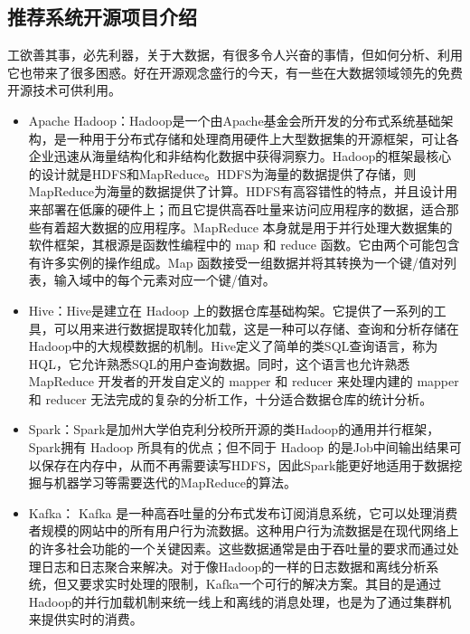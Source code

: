 	\subsection{推荐系统开源项目介绍}
	工欲善其事，必先利器，关于大数据，有很多令人兴奋的事情，但如何分析、利用它也带来了很多困惑。好在开源观念盛行的今天，有一些在大数据领域领先的免费开源技术可供利用。
	\begin{itemize}
		\item Apache Hadoop：Hadoop是一个由Apache基金会所开发的分布式系统基础架构，是一种用于分布式存储和处理商用硬件上大型数据集的开源框架，可让各企业迅速从海量结构化和非结构化数据中获得洞察力。Hadoop的框架最核心的设计就是HDFS和MapReduce。HDFS为海量的数据提供了存储，则MapReduce为海量的数据提供了计算。HDFS有高容错性的特点，并且设计用来部署在低廉的硬件上；而且它提供高吞吐量来访问应用程序的数据，适合那些有着超大数据的应用程序。MapReduce 本身就是用于并行处理大数据集的软件框架，其根源是函数性编程中的 map 和 reduce 函数。它由两个可能包含有许多实例的操作组成。Map 函数接受一组数据并将其转换为一个键/值对列表，输入域中的每个元素对应一个键/值对。
		\item Hive：Hive是建立在 Hadoop 上的数据仓库基础构架。它提供了一系列的工具，可以用来进行数据提取转化加载，这是一种可以存储、查询和分析存储在Hadoop中的大规模数据的机制。Hive定义了简单的类SQL查询语言，称为HQL，它允许熟悉SQL的用户查询数据。同时，这个语言也允许熟悉 MapReduce 开发者的开发自定义的 mapper 和 reducer 来处理内建的 mapper 和 reducer 无法完成的复杂的分析工作，十分适合数据仓库的统计分析。
		\item Spark：Spark是加州大学伯克利分校所开源的类Hadoop的通用并行框架，Spark拥有 Hadoop 所具有的优点；但不同于 Hadoop 的是Job中间输出结果可以保存在内存中，从而不再需要读写HDFS，因此Spark能更好地适用于数据挖掘与机器学习等需要迭代的MapReduce的算法。
		\item Kafka： Kafka 是一种高吞吐量的分布式发布订阅消息系统，它可以处理消费者规模的网站中的所有用户行为流数据。这种用户行为流数据是在现代网络上的许多社会功能的一个关键因素。这些数据通常是由于吞吐量的要求而通过处理日志和日志聚合来解决。对于像Hadoop的一样的日志数据和离线分析系统，但又要求实时处理的限制，Kafka一个可行的解决方案。其目的是通过Hadoop的并行加载机制来统一线上和离线的消息处理，也是为了通过集群机来提供实时的消费。
	\end{itemize}

